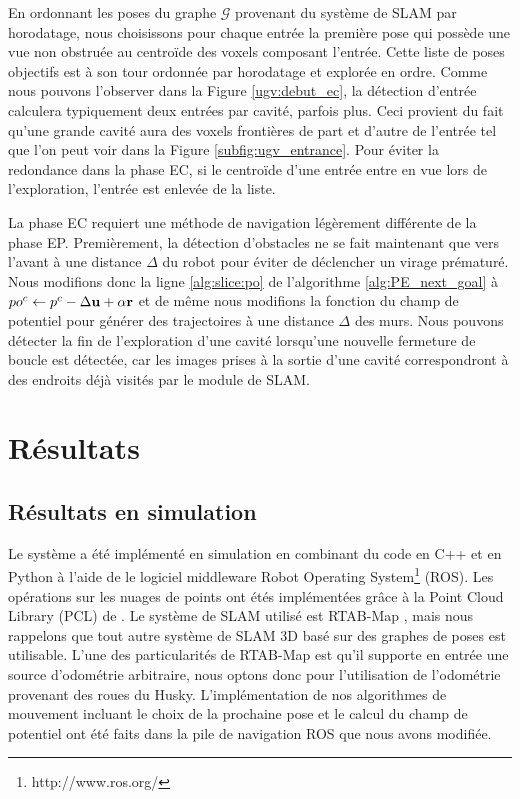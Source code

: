 En ordonnant les poses du graphe $\mathcal G$ provenant du système de SLAM par horodatage, nous choisissons pour chaque entrée la première pose qui possède une vue non obstruée au centroïde des voxels composant l'entrée. Cette liste de poses objectifs est à son tour ordonnée par horodatage et explorée en ordre. Comme nous pouvons l'observer dans la Figure \ref{ugv:debut_ec}, la détection d'entrée calculera typiquement deux entrées par cavité, parfois plus. Ceci provient du fait qu’une grande cavité aura des voxels frontières de part et d'autre de l'entrée tel que l'on peut voir dans la Figure \ref{subfig:ugv_entrance}.  Pour éviter la redondance dans la phase EC, si le centroïde d'une entrée entre en vue lors de l'exploration, l'entrée est enlevée de la liste.

La phase EC requiert une méthode de navigation légèrement différente de la phase EP. Premièrement, la détection d'obstacles ne se fait maintenant que vers l'avant à une distance $\Delta$ du robot pour éviter de déclencher un virage prématuré. Nous modifions donc la ligne \ref{alg:slice:po} de l'algorithme \ref{alg:PE_next_goal} à ${po^c} \gets p^c - \Delta \mathbf{u} + \alpha \mathbf{r}$ et de même nous modifions la fonction du champ de potentiel pour générer des trajectoires à une distance $\Delta$ des murs. Nous pouvons détecter la fin de l'exploration d'une cavité lorsqu'une nouvelle fermeture de boucle est détectée, car les images prises à la sortie d'une cavité correspondront à des endroits déjà visités par le module de SLAM.

\section{Résultats} \label{sec:ugv_results}

\subsection{Résultats en simulation}

Le système a été implémenté en simulation en combinant du code en C++ et en Python à l'aide de le logiciel middleware Robot Operating System\footnote{http://www.ros.org/} (ROS). Les opérations sur les nuages de points ont étés implémentées grâce à la Point Cloud Library (PCL) de \cite{Rusu2011}. Le système de SLAM utilisé est RTAB-Map \citep{Labbe2014}, mais nous rappelons que tout autre système de SLAM 3D basé sur des graphes de poses est utilisable. L'une des particularités de RTAB-Map est qu'il supporte en entrée une source d'odométrie arbitraire, nous optons donc pour l'utilisation de l'odométrie provenant des roues du Husky. L'implémentation de nos algorithmes de mouvement incluant le choix de la prochaine pose et le calcul du champ de potentiel ont été faits dans la pile de navigation ROS \citep{Mader2010} que nous avons modifiée.

